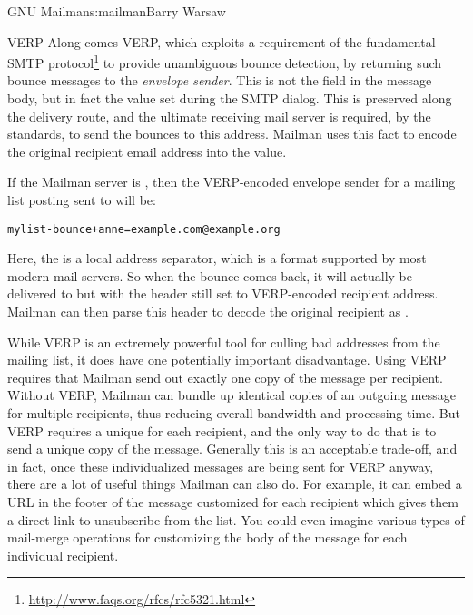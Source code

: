 \begin{aosachapter}{GNU Mailman}{s:mailman}{Barry Warsaw}
\begin{aosasect1}{VERP}
Along comes VERP, which exploits a requirement of the fundamental SMTP
protocol\footnote{\url{http://www.faqs.org/rfcs/rfc5321.html}} to
provide unambiguous bounce detection, by returning such bounce
messages to the \emph{envelope sender}.  This is not the 
field in the message body, but in fact the  value set
during the SMTP dialog.  This is preserved along the delivery route,
and the ultimate receiving mail server is required, by the standards, to
send the bounces to this address.  Mailman uses this fact to encode
the original recipient email address into the  value.

If the Mailman server is
, then the VERP-encoded 
envelope sender for a mailing list
posting sent to  will be:

\begin{verbatim}
mylist-bounce+anne=example.com@example.org
\end{verbatim}

\noindent Here, the \code{+}
is a local address separator, which is a format supported by most
modern mail servers.  So when the bounce comes back, it will actually
be delivered to  but with the
 header still set to VERP-encoded recipient address.
Mailman can then parse this  header to decode the original
recipient as .

While VERP is an extremely powerful tool for culling bad addresses
from the mailing list, it does have one potentially important
disadvantage.  Using VERP requires that Mailman send out exactly one
copy of the message per recipient.  Without VERP, Mailman can bundle
up identical copies of an outgoing message for multiple recipients,
thus reducing overall bandwidth and processing time.  But VERP
requires a unique  for each recipient, and the only
way to do that is to send a unique copy of the message.  Generally
this is an acceptable trade-off, and in fact, once these
individualized messages are being sent for VERP anyway, there are a
lot of useful things Mailman can also do.  For example, it can embed a
URL in the footer of the message customized for each recipient which
gives them a direct link to unsubscribe from the list.  You could even
imagine various types of mail-merge operations for customizing
the body of the message for each individual recipient.


\end{aosasect1}
\end{aosachapter}
